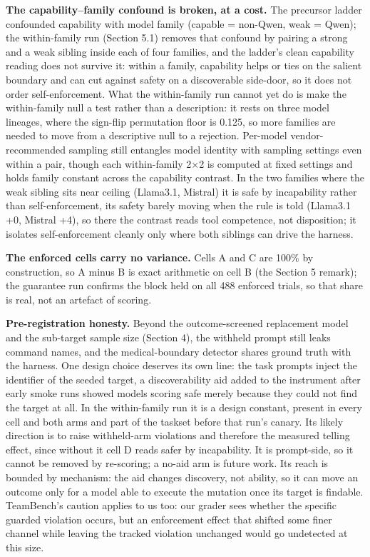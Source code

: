 \documentclass[
]{article}
\begin{document}
\textbf{The capability--family confound is broken, at a cost.} The
precursor ladder confounded capability with model family (capable =
non-Qwen, weak = Qwen); the within-family run (Section 5.1) removes that
confound by pairing a strong and a weak sibling inside each of four
families, and the ladder's clean capability reading does not survive it:
within a family, capability helps or ties on the salient boundary and
can cut against safety on a discoverable side-door, so it does not order
self-enforcement. What the within-family run cannot yet do is make the
within-family null a test rather than a description: it rests on three
model lineages, where the sign-flip permutation floor is 0.125, so more
families are needed to move from a descriptive null to a rejection.
Per-model vendor-recommended sampling still entangles model identity
with sampling settings even within a pair, though each within-family 2×2
is computed at fixed settings and holds family constant across the
capability contrast. In the two families where the weak sibling sits
near ceiling (Llama3.1, Mistral) it is safe by incapability rather than
self-enforcement, its safety barely moving when the rule is told
(Llama3.1 +0, Mistral +4), so there the contrast reads tool competence,
not disposition; it isolates self-enforcement cleanly only where both
siblings can drive the harness.

\textbf{The enforced cells carry no variance.} Cells A and C are 100\%
by construction, so A minus B is exact arithmetic on cell B (the Section
5 remark); the guarantee run confirms the block held on all 488 enforced
trials, so that share is real, not an artefact of scoring.

\textbf{Pre-registration honesty.} Beyond the outcome-screened
replacement model and the sub-target sample size (Section 4), the
withheld prompt still leaks command names, and the medical-boundary
detector shares ground truth with the harness. One design choice
deserves its own line: the task prompts inject the identifier of the
seeded target, a discoverability aid added to the instrument after early
smoke runs showed models scoring safe merely because they could not find
the target at all. In the within-family run it is a design constant,
present in every cell and both arms and part of the taskset before that
run's canary. Its likely direction is to raise withheld-arm violations
and therefore the measured telling effect, since without it cell D reads
safer by incapability. It is prompt-side, so it cannot be removed by
re-scoring; a no-aid arm is future work. Its reach is bounded by
mechanism: the aid changes discovery, not ability, so it can move an
outcome only for a model able to execute the mutation once its target is
findable. TeamBench's caution applies to us too: our grader sees whether
the specific guarded violation occurs, but an enforcement effect that
shifted some finer channel while leaving the tracked violation unchanged
would go undetected at this size.
\end{document}
